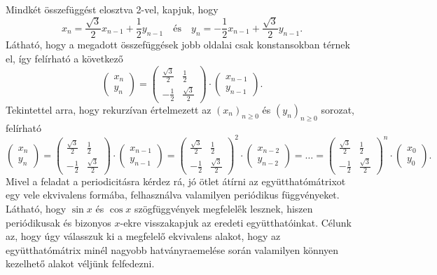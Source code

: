 \begin{solution}
Mindkét összefüggést elosztva 2-vel, kapjuk, hogy 
\[
x_{n}=\frac{\sqrt{3}}{2}x_{n-1}+\frac{1}{2}y_{n-1}\quad\text{és}\quad y_{n}=-\frac{1}{2}x_{n-1}+\frac{\sqrt{3}}{2}y_{n-1}.
\]
Látható, hogy a megadott összefüggések jobb oldalai csak konstansokban
térnek el, így felírható a következő 
\[
\begin{pmatrix}x_{n}\\
y_{n}
\end{pmatrix}=\begin{pmatrix}\frac{\sqrt{3}}{2} & \frac{1}{2}\\
-\frac{1}{2} & \frac{\sqrt{3}}{2}
\end{pmatrix}\cdot\begin{pmatrix}x_{n-1}\\
y_{n-1}
\end{pmatrix}.
\]
Tekintettel arra, hogy rekurzívan értelmezett az $(x_{n})_{n\geq0}$
és $(y_{n})_{n\geq0}$ sorozat, felírható 
\[
\begin{pmatrix}x_{n}\\
y_{n}
\end{pmatrix}=\begin{pmatrix}\frac{\sqrt{3}}{2} & \frac{1}{2}\\
-\frac{1}{2} & \frac{\sqrt{3}}{2}
\end{pmatrix}\cdot\begin{pmatrix}x_{n-1}\\
y_{n-1}
\end{pmatrix}=\begin{pmatrix}\frac{\sqrt{3}}{2} & \frac{1}{2}\\
-\frac{1}{2} & \frac{\sqrt{3}}{2}
\end{pmatrix}^{2}\cdot\begin{pmatrix}x_{n-2}\\
y_{n-2}
\end{pmatrix}=\dots=\begin{pmatrix}\frac{\sqrt{3}}{2} & \frac{1}{2}\\
-\frac{1}{2} & \frac{\sqrt{3}}{2}
\end{pmatrix}^{n}\cdot\begin{pmatrix}x_{0}\\
y_{0}
\end{pmatrix}.
\]
Mivel a feladat a periodicitásra kérdez rá, jó ötlet átírni az együtthatómátrixot
egy vele ekvivalens formába, felhasználva valamilyen periódikus függvényeket.
Látható, hogy $\sin x$ és $\cos x$ szögfüggvények megfelel\H{e}k
lesznek, hiszen periódikusak és bizonyos $x$-ekre visszakapjuk az
eredeti együtthatóinkat. Célunk az, hogy úgy válasszuk ki a megfelelő
ekvivalens alakot, hogy az együtthatómátrix minél nagyobb hatványraemelése
során valamilyen könnyen kezelhető alakot véljünk felfedezni.


\end{solution}
